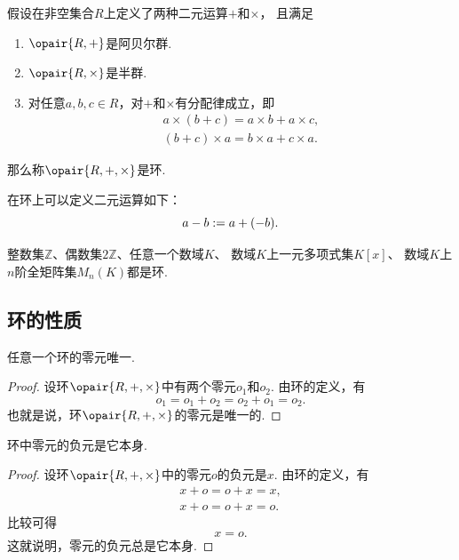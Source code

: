 \begin{theorem}
假设在非空集合\(R\)上定义了两种二元运算\(+\)和\(\times\)，
且满足\begin{enumerate}
	\item \(\opair{R,+}\)是阿贝尔群.

	\item \(\opair{R,\times}\)是半群.

	\item 对任意\(a,b,c \in R\)，对\(+\)和\(\times\)有分配律成立，即\begin{gather*}
		a \times (b + c) = a \times b + a \times c, \\
		(b + c) \times a = b \times a + c \times a.
	\end{gather*}
\end{enumerate}
那么称\(\opair{R,+,\times}\)是环.
\end{theorem}

在环上可以定义二元运算如下：\begin{equation*}
	a - b := a + (-b).
\end{equation*}

\begin{example}
整数集\(\mathbb{Z}\)、偶数集\(2\mathbb{Z}\)、任意一个数域\(K\)、
数域\(K\)上一元多项式集\(K[x]\)、
数域\(K\)上\(n\)阶全矩阵集\(M_n(K)\)都是环.
\end{example}

\subsection{环的性质}
\begin{property}
任意一个环的零元唯一.
\begin{proof}
设环\(\opair{R,+,\times}\)中有两个零元\(o_1\)和\(o_2\).
由环的定义，有\begin{equation*}
	o_1 = o_1 + o_2 = o_2 + o_1 = o_2.
\end{equation*}
也就是说，环\(\opair{R,+,\times}\)的零元是唯一的.
\end{proof}
\end{property}

\begin{property}
环中零元的负元是它本身.
\begin{proof}
设环\(\opair{R,+,\times}\)中的零元\(o\)的负元是\(x\).
由环的定义，有\begin{gather*}
	x + o = o + x = x, \\
	x + o = o + x = o.
\end{gather*}
比较可得\begin{equation*}
	x = o.
\end{equation*}
这就说明，零元的负元总是它本身.
\end{proof}
\end{property}

